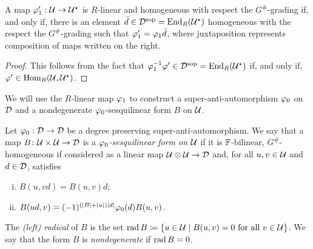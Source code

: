 \documentclass{amsbook}
\begin{document}
\begin{lemma}\label{lemma:nonuniqueness-of-vphi1}
    A map $\varphi_1' : \mathcal U \to \mathcal U^\star$ is $R$-linear and homogeneous with respect the $G^\#$-grading if, and only if, there is an element $\bar d\in \mathcal{D}^{\mathrm{sop}} = \operatorname{End}_R (\mathcal U^\star)$ homogeneous with the respect the $G^\#$-grading such that $ \varphi_1' = \varphi_1 \bar d$, where juxtaposition represents composition of maps written on the right.
\end{lemma}

\begin{proof}
    This follows from the fact that $ \varphi_1^{-1} \varphi' \in  \mathcal{D}^{\mathrm{sop}} = \operatorname{End}_R(\mathcal U^\star)$ if, and only if, $\varphi' \in \operatorname{Hom}_R(\mathcal U, \mathcal U^\star)$.
\end{proof}


We will use 
the $R$-linear map 
$\varphi_1$ to construct a super-anti-automorphism $\varphi_0$ on $\mathcal{D}$ and a nondegenerate $\varphi_0$-sesquilinear form $B$ on $\mathcal U$. 

\begin{defi}\label{def:sesquilinear-form}
    Let $\varphi_0: \mathcal{D} \to \mathcal{D}$ be a degree preserving su\-per\--an\-ti\--auto\-mor\-phism. We say that a map $B\colon \mathcal U \times \mathcal U \to \mathcal{D}$ is a \emph{$\varphi_0$-sesquilinear form on $\mathcal U$} if it is $\mathbb{F}$-bilinear, $G^\#$-homogeneous if considered as a linear map $\mathcal U\otimes \mathcal U \to \mathcal{D}$ and, for all $u,v \in \mathcal U$ and $d\in \mathcal{D}$, satisfies
    \begin{enumerate}[(i)]
        \item $B(u,vd) = B(u,v)d$; \label{enum:linear-on-the-second}
        \item $B(ud, v) = (-1)^ {(|B| + |u|)|d|}\varphi_0(d) B(u, v)$. \label{enum:vphi0-linear-on-the-first}
    \end{enumerate}
    
    The \emph{(left) radical} of $B$ is the set $\operatorname{rad} B \coloneqq \{u\in \mathcal U \mid B(u, v) = 0 \text{ for all } v\in \mathcal U\}$. We say that the form $B$ is \emph{nondegenerate} if $\operatorname{rad} B = 0$.
\end{defi}
\end{document}

